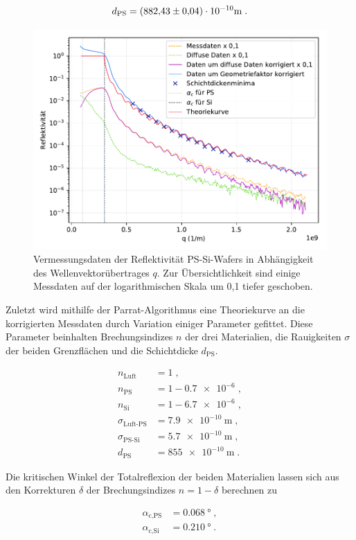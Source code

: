 \vspace{-20pt}
\begin{equation*}
    d_\text{PS} = (\num{882.43 +- 0.04}) \cdot 10^{-10} \si{\meter} \; .
\end{equation*}

\begin{figure}[H]
    \centering
    \includegraphics[scale=0.7]{content/plot4.pdf}
    \vspace{-10pt}
    \caption{Vermessungsdaten der Reflektivität PS-Si-Wafers in Abhängigkeit des Wellenvektorübertrages $q$.
            Zur Übersichtlichkeit sind einige Messdaten auf der logarithmischen Skala um 0,1 tiefer geschoben.}
    \label{fig:plot4}
\end{figure}

Zuletzt wird mithilfe der Parrat-Algorithmus eine Theoriekurve an die 
korrigierten Messdaten durch Variation einiger Parameter gefittet.
Diese Parameter beinhalten Brechungsindizes $n$ der drei Materialien, 
die Rauigkeiten $\sigma$ der beiden Grenzflächen und die Schichtdicke $d_\text{PS}$.

\vspace{-35pt}
\begin{align*}
    n_\text{Luft} &= 1 \; ,\\
    n_\text{PS} &= 1 - \num{0.7e-6} \; ,\\
    n_\text{Si} &= 1 - \num{6.7e-6} \; ,\\
    \sigma_\text{Luft-PS} &= \SI{7.9e-10}{\meter} \; ,\\
    \sigma_\text{PS-Si} &= \SI{5.7e-10}{\meter} \; ,\\
    d_\text{PS} &= \SI{855e-10}{\meter} \; .
\end{align*}

Die kritischen Winkel der Totalreflexion der beiden Materialien
lassen sich aus den Korrekturen $\delta$ der Brechungsindizes 
$n = 1 - \delta$ berechnen zu

\vspace{-20pt}
\begin{align*}
    \alpha_\text{c,PS} &= \SI{0.068}{\degree} \; ,\\
    \alpha_\text{c,Si} &= \SI{0.210}{\degree} \; .\\
\end{align*}

